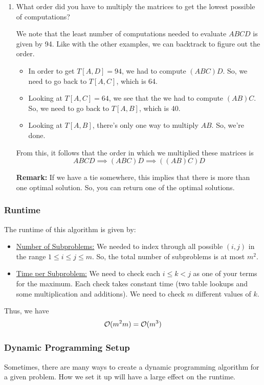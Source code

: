\documentclass[letterpaper]{article}
\begin{document}
\begin{enumerate}
    \item What order did you have to multiply the matrices to get the lowest possible of computations? 
    \begin{mdframed}[]
        We note that the least number of computations needed to evaluate $ABCD$ is given by 94. Like with the other examples, we can backtrack to figure out the order. 
        \begin{itemize}
            \item In order to get $T[A, D] = 94$, we had to compute $(ABC)D$. So, we need to go back to $T[A, C]$, which is 64. 
            \item Looking at $T[A, C] = 64$, we see that the we had to compute $(AB)C$. So, we need to go back to $T[A, B]$, which is 40.
            \item Looking at $T[A, B]$, there's only one way to multiply $AB$. So, we're done.  
        \end{itemize}
        From this, it follows that the order in which we multiplied these matrices is 
        \[ABCD \implies (ABC)D \implies \boxed{((AB)C)D}\]
    \end{mdframed}
    \textbf{Remark:} If we have a tie somewhere, this implies that there is more than one optimal solution. So, you can return one of the optimal solutions. 
\end{enumerate}

\subsubsection{Runtime}
The runtime of this algorithm is given by: 
\begin{itemize}
    \item \underline{Number of Subproblems:} We needed to index through all possible $(i, j)$ in the range $1 \leq i \leq j \leq m$. So, the total number of subproblems is at most $m^2$.
    \item \underline{Time per Subproblem:} We need to check each $i \leq k < j$ as one of your terms for the maximum. Each check takes constant time (two table lookups and some multiplication and additions). We need to check $m$ different values of $k$.
\end{itemize}
Thus, we have 
\[\mathcal{O}(m^2 m) = \mathcal{O}(m^3)\]

\subsubsection{Dynamic Programming Setup}
Sometimes, there are many ways to create a dynamic programming algorithm for a given problem. How we set it up will have a large effect on the runtime. 
\end{document}

